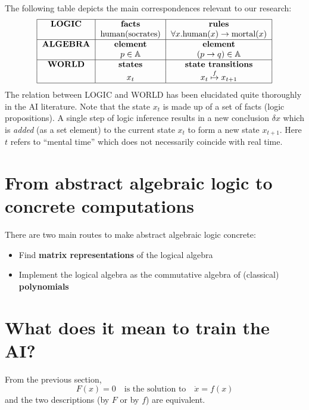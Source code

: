 The following table depicts the main correspondences relevant to our research:
\begin{equation}
\begin{tabular}{|c|c|c|}
	\hline
	\textbf{LOGIC} & \textbf{facts} & \textbf{rules} \\
		& \mbox{human(socrates)} & $\forall x. \mbox{human}(x) \rightarrow \mbox{mortal}(x)$ \\
	\hline
	\textbf{ALGEBRA} & \textbf{element} & \textbf{element} \\
		& $p \in \mathbb{A} $ & $(p \rightarrow q) \in \mathbb{A} $ \\
	\hline
	\textbf{WORLD} & \textbf{states} & \textbf{state transitions} \\
		& $x_t$ & $x_t \stackrel{f}{\mapsto} x_{t+1}$ \\
	\hline
\end{tabular}
\end{equation}
The relation between LOGIC and WORLD has been elucidated quite thoroughly in the AI literature.  Note that the state $x_t$ is made up of a set of facts (logic propositions).  A single step of logic inference results in a new conclusion $\delta x$ which is \textit{added} (as a set element) to the current state $x_t$ to form a new state $x_{t+1}$.  Here $t$ refers to ``mental time'' which does not necessarily coincide with real time.

\section{From abstract algebraic logic to concrete computations}

There are two main routes to make abstract algebraic logic concrete:
\begin{itemize}
	\item Find \textbf{matrix representations} of the logical algebra
	\item Implement the logical algebra as the commutative algebra of (classical) \textbf{polynomials}
\end{itemize}

\section{What does it mean to train the AI?}

From the previous section,
\begin{equation}
F(x) = 0 \quad \mbox{is the solution to} \quad \dot{x} = f(x)
\end{equation}
and the two descriptions (by $F$ or by $f$) are equivalent.

